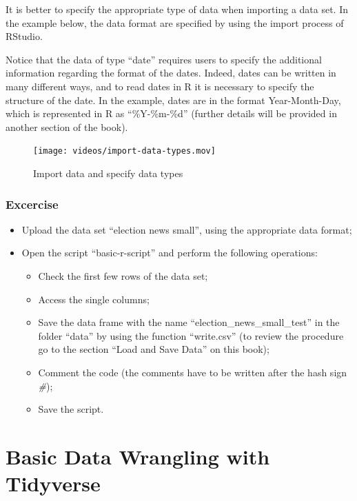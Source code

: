 \documentclass[
]{article}
\providecommand{\tightlist}{%
  \setlength{\itemsep}{0pt}\setlength{\parskip}{0pt}}
\begin{document}
It is better to specify the appropriate type of data when importing a data set. In the example below, the data format are specified by using the import process of RStudio.

Notice that the data of type ``date'' requires users to specify the additional information regarding the format of the dates. Indeed, dates can be written in many different ways, and to read dates in R it is necessary to specify the structure of the date. In the example, dates are in the format Year-Month-Day, which is represented in R as ``\%Y-\%m-\%d'' (further details will be provided in another section of the book).

\begin{figure}
\centering
\texttt{[image: videos/import-data-types.mov]}
\caption{Import data and specify data types}
\end{figure}

\hypertarget{excercise}{%
\subsubsection{Excercise}\label{excercise}}

\begin{itemize}
\tightlist
\item
  Upload the data set ``election news small'', using the appropriate data format;
\item
  Open the script ``basic-r-script'' and perform the following operations:

  \begin{itemize}
  \tightlist
  \item
    Check the first few rows of the data set;
  \item
    Access the single columns;
  \item
    Save the data frame with the name ``election\_news\_small\_test'' in the folder ``data'' by using the function ``write.csv'' (to review the procedure go to the section ``Load and Save Data'' on this book);
  \item
    Comment the code (the comments have to be written after the hash sign \emph{\#});
  \item
    Save the script.
  \end{itemize}
\end{itemize}

\hypertarget{basic-data-wrangling-with-tidyverse}{%
\section{Basic Data Wrangling with Tidyverse}\label{basic-data-wrangling-with-tidyverse}}
\end{document}
